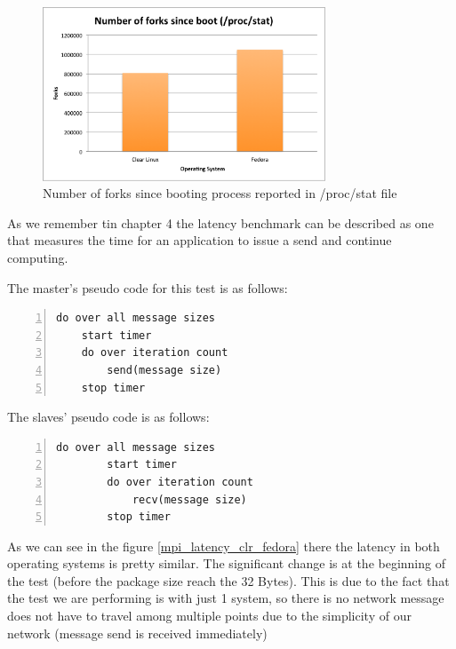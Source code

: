 \begin{figure}[H]
\centering
\includegraphics[width=0.75\textwidth]{images/number_forks.png}
\caption{Number of forks since booting process reported in /proc/stat file }
\label{number_forks_fedora_clr}
\end{figure}

As we remember tin chapter 4 the latency benchmark can be described as one that
measures the time for an application to issue a send and continue computing.

The master's pseudo code for this test is as follows:

\begin{lstlisting}[frame=single,numbers=left]
do over all message sizes 
    start timer
    do over iteration count 
        send(message size) 
    stop timer
\end{lstlisting}    

The slaves' pseudo code is as follows:

\begin{lstlisting}[frame=single,numbers=left]
   do over all message sizes 
        start timer
        do over iteration count 
            recv(message size) 
        stop timer
\end{lstlisting}


As we can see in the figure \ref{mpi_latency_clr_fedora} there the latency in
both operating systems is pretty similar. The significant change is at the
beginning of the test (before the package size reach the 32 Bytes). This is due
to the fact that the test we are performing is with just 1 system, so there is
no network message does not have to travel among multiple points due to the
simplicity of our network (message send is received immediately) 


